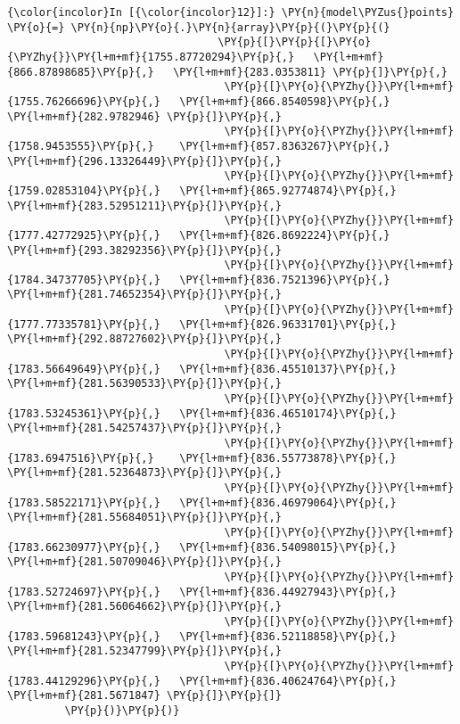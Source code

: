     \begin{Verbatim}[commandchars=\\\{\}]
{\color{incolor}In [{\color{incolor}12}]:} \PY{n}{model\PYZus{}points} \PY{o}{=} \PY{n}{np}\PY{o}{.}\PY{n}{array}\PY{p}{(}\PY{p}{(}
                                 \PY{p}{[}\PY{p}{[}\PY{o}{\PYZhy{}}\PY{l+m+mf}{1755.87720294}\PY{p}{,}   \PY{l+m+mf}{866.87898685}\PY{p}{,}   \PY{l+m+mf}{283.0353811} \PY{p}{]}\PY{p}{,}
                                  \PY{p}{[}\PY{o}{\PYZhy{}}\PY{l+m+mf}{1755.76266696}\PY{p}{,}   \PY{l+m+mf}{866.8540598}\PY{p}{,}    \PY{l+m+mf}{282.9782946} \PY{p}{]}\PY{p}{,}
                                  \PY{p}{[}\PY{o}{\PYZhy{}}\PY{l+m+mf}{1758.9453555}\PY{p}{,}    \PY{l+m+mf}{857.8363267}\PY{p}{,}    \PY{l+m+mf}{296.13326449}\PY{p}{]}\PY{p}{,}
                                  \PY{p}{[}\PY{o}{\PYZhy{}}\PY{l+m+mf}{1759.02853104}\PY{p}{,}   \PY{l+m+mf}{865.92774874}\PY{p}{,}   \PY{l+m+mf}{283.52951211}\PY{p}{]}\PY{p}{,}
                                  \PY{p}{[}\PY{o}{\PYZhy{}}\PY{l+m+mf}{1777.42772925}\PY{p}{,}   \PY{l+m+mf}{826.8692224}\PY{p}{,}    \PY{l+m+mf}{293.38292356}\PY{p}{]}\PY{p}{,}
                                  \PY{p}{[}\PY{o}{\PYZhy{}}\PY{l+m+mf}{1784.34737705}\PY{p}{,}   \PY{l+m+mf}{836.7521396}\PY{p}{,}    \PY{l+m+mf}{281.74652354}\PY{p}{]}\PY{p}{,}
                                  \PY{p}{[}\PY{o}{\PYZhy{}}\PY{l+m+mf}{1777.77335781}\PY{p}{,}   \PY{l+m+mf}{826.96331701}\PY{p}{,}   \PY{l+m+mf}{292.88727602}\PY{p}{]}\PY{p}{,}
                                  \PY{p}{[}\PY{o}{\PYZhy{}}\PY{l+m+mf}{1783.56649649}\PY{p}{,}   \PY{l+m+mf}{836.45510137}\PY{p}{,}   \PY{l+m+mf}{281.56390533}\PY{p}{]}\PY{p}{,}
                                  \PY{p}{[}\PY{o}{\PYZhy{}}\PY{l+m+mf}{1783.53245361}\PY{p}{,}   \PY{l+m+mf}{836.46510174}\PY{p}{,}   \PY{l+m+mf}{281.54257437}\PY{p}{]}\PY{p}{,}
                                  \PY{p}{[}\PY{o}{\PYZhy{}}\PY{l+m+mf}{1783.6947516}\PY{p}{,}    \PY{l+m+mf}{836.55773878}\PY{p}{,}   \PY{l+m+mf}{281.52364873}\PY{p}{]}\PY{p}{,}
                                  \PY{p}{[}\PY{o}{\PYZhy{}}\PY{l+m+mf}{1783.58522171}\PY{p}{,}   \PY{l+m+mf}{836.46979064}\PY{p}{,}   \PY{l+m+mf}{281.55684051}\PY{p}{]}\PY{p}{,}
                                  \PY{p}{[}\PY{o}{\PYZhy{}}\PY{l+m+mf}{1783.66230977}\PY{p}{,}   \PY{l+m+mf}{836.54098015}\PY{p}{,}   \PY{l+m+mf}{281.50709046}\PY{p}{]}\PY{p}{,}
                                  \PY{p}{[}\PY{o}{\PYZhy{}}\PY{l+m+mf}{1783.52724697}\PY{p}{,}   \PY{l+m+mf}{836.44927943}\PY{p}{,}   \PY{l+m+mf}{281.56064662}\PY{p}{]}\PY{p}{,}
                                  \PY{p}{[}\PY{o}{\PYZhy{}}\PY{l+m+mf}{1783.59681243}\PY{p}{,}   \PY{l+m+mf}{836.52118858}\PY{p}{,}   \PY{l+m+mf}{281.52347799}\PY{p}{]}\PY{p}{,}
                                  \PY{p}{[}\PY{o}{\PYZhy{}}\PY{l+m+mf}{1783.44129296}\PY{p}{,}   \PY{l+m+mf}{836.40624764}\PY{p}{,}   \PY{l+m+mf}{281.5671847} \PY{p}{]}\PY{p}{]}
         \PY{p}{)}\PY{p}{)}
\end{Verbatim}


